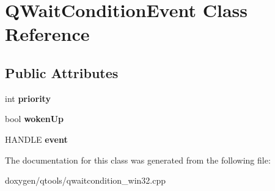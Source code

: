 \hypertarget{class_q_wait_condition_event}{}\section{Q\+Wait\+Condition\+Event Class Reference}
\label{class_q_wait_condition_event}
\subsection*{Public Attributes}
\begin{DoxyCompactItemize}
\item 
\mbox{\label{class_q_wait_condition_event_a351e06c58f4ace913a1d5369eeb8691c}} 
int {\bfseries priority}
\item 
\mbox{\label{class_q_wait_condition_event_afdc3de72ba7b6fee1335fad8a7da2d97}} 
bool {\bfseries woken\+Up}
\item 
\mbox{\label{class_q_wait_condition_event_a40764ecfe405ec77c5c984653d9aa27f}} 
H\+A\+N\+D\+LE {\bfseries event}
\end{DoxyCompactItemize}


The documentation for this class was generated from the following file\+:\begin{DoxyCompactItemize}
\item 
doxygen/qtools/qwaitcondition\+\_\+win32.\+cpp\end{DoxyCompactItemize}
